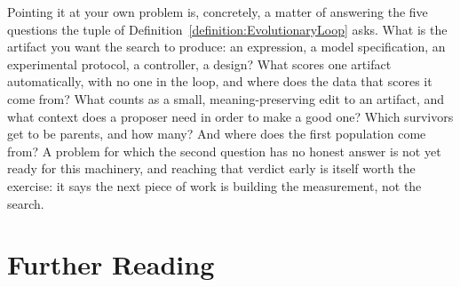 Pointing it at your own problem is, concretely, a matter of answering the five questions the tuple of Definition~\ref{definition:EvolutionaryLoop} asks.
What is the artifact you want the search to produce: an expression, a model specification, an experimental protocol, a controller, a design?
What scores one artifact automatically, with no one in the loop, and where does the data that scores it come from?
What counts as a small, meaning-preserving edit to an artifact, and what context does a proposer need in order to make a good one?
Which survivors get to be parents, and how many?
And where does the first population come from?
A problem for which the second question has no honest answer is not yet ready for this machinery, and reaching that verdict early is itself worth the exercise: it says the next piece of work is building the measurement, not the search.

\section*{Further Reading}

